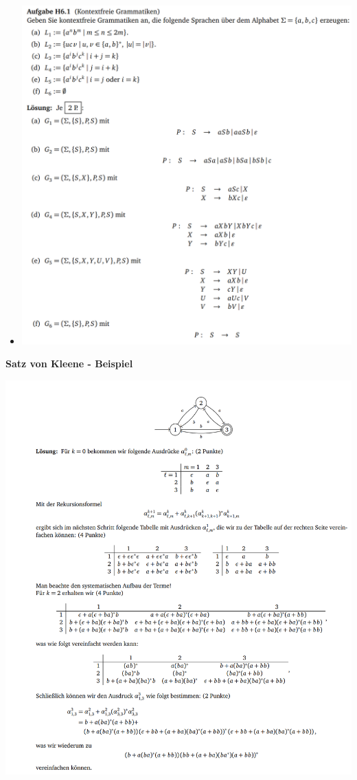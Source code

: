\documentclass[11pt,a4paper]{article}
\begin{document}
{\begin{itemize}
\item[]
\begin{center}
\includegraphics[scale=1]{gram3}
\end{center}

\end{itemize}

\pagebreak

{\Large \textbf{Satz von Kleene - Beispiel}}

\begin{center}
\includegraphics[scale=1]{kleenebsp}
\end{center}

}
\end{document}
